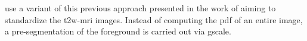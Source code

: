 \begin{enumerate}[leftmargin=*]

\cite{Viswanath2009,Viswanath2011,Viswanath2012} use a variant of this previous approach presented in the work of \cite{Madabhushi2006a} aiming to standardize the \ac{t2w}-\ac{mri} images. Instead of computing the \ac{pdf} of an entire image, a pre-segmentation of the foreground is carried out via \ac{gscale}.%


\end{enumerate}
